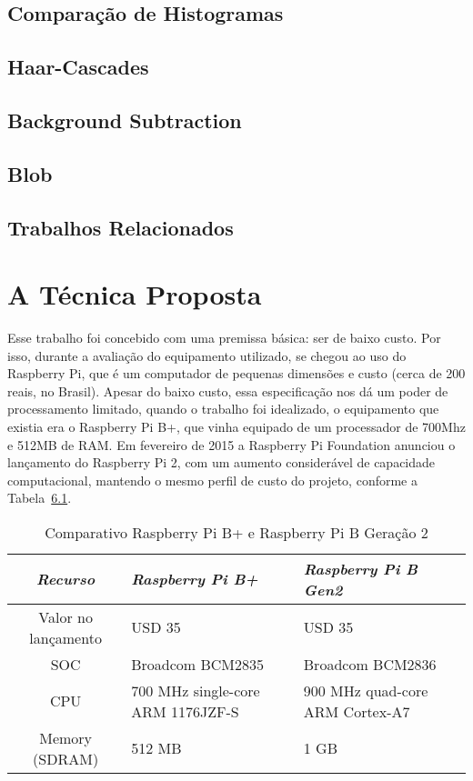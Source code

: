 \documentclass[ecp,tc]{iiufrgs}
\begin{document}
\section{Comparação de Histogramas}

\section{Haar-Cascades}

\section{Background Subtraction}

\section{Blob}

\section{Trabalhos Relacionados}

\chapter{A Técnica Proposta}

Esse trabalho foi concebido com uma premissa básica: ser de baixo custo. Por isso, durante a avaliação do equipamento utilizado, se chegou ao uso do Raspberry Pi, que é um computador de pequenas dimensões e custo (cerca de 200 reais, no Brasil). Apesar do baixo custo, essa especificação nos dá um poder de processamento limitado, quando o trabalho foi idealizado, o equipamento que existia era o Raspberry Pi B+, que vinha equipado de um processador de 700Mhz e 512MB de RAM. Em fevereiro de 2015 a Raspberry Pi Foundation anunciou o lançamento do Raspberry Pi 2, com um aumento considerável de capacidade computacional, mantendo o mesmo perfil de custo do projeto, conforme a Tabela~\ref{tbl:rpi}.

\begin{table}
	\caption{Comparativo Raspberry Pi B+ e Raspberry Pi B Geração 2}
	\begin{center}
		\begin{tabular}{c|p{5cm}|p{5cm}}
			\textit{Recurso}  &   \textit{Raspberry Pi B+}  &   \textit{Raspberry Pi B Gen2} \\
			\hline
			\hline
			Valor no lançamento & USD 35 & USD 35 \\
			\hline
			SOC & Broadcom BCM2835  & Broadcom BCM2836 \\
			\hline
			CPU & 700 MHz single-core ARM 1176JZF-S & 900 MHz quad-core ARM Cortex-A7 \\
			\hline
			Memory (SDRAM) & 512 MB & 1 GB \\
			\hline
		\end{tabular}
	\end{center}
	\label{tbl:rpi}
\end{table}
\end{document}
